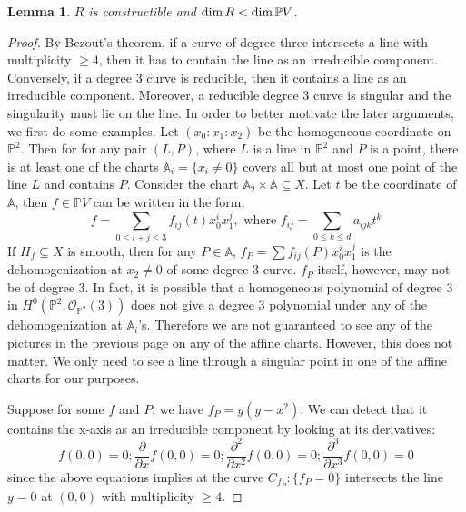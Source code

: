\documentclass[12pt]{article}
\theoremstyle{plain}
\newtheorem{lemma}[equation]{Lemma}
\theoremstyle{definition}
\newcommand{\IA}{\mathbb{A}}
\newcommand{\IP}{\mathbb{P}}
\newcommand{\sO}{\mathcal{O}}
\renewcommand\dim{{\rm dim\,}}
\newcommand{\<}{\langle}
\renewcommand{\>}{\rangle}
\newcommand{\p}{\partial}
\begin{document}
\begin{lemma}
$R$ is constructible and $\dim R < \dim \IP V$. 
\end{lemma}
\begin{proof}
By Bezout's theorem, if a curve of degree three intersects a line with multiplicity $\ge 4$, then it has to contain the line as an irreducible component. Conversely, if a degree 3 curve is reducible, then it contains a line as an irreducible component. Moreover, a reducible degree 3 curve is singular and the singularity must lie on the line. In order to better motivate the later arguments, we first do some examples. Let $(x_0 : x_1 : x_2)$ be the homogeneous coordinate on $\IP^2$. Then for for any pair $(L, P)$, where $L$ is a line in $\IP^2$ and $P$ is a point, there is at least one of the charts $\IA_i = \{ x_i  \neq 0 \}$ covers all but at most one point of the line $L$ and contains $P$. Consider the chart $\IA_2 \times \IA \subseteq X$. Let $t$ be the coordinate of $\IA$, then $f \in \IP V$ can be written in the form,
$$ f = \sum_{0 \le i + j \le 3} f_{ij}(t) x_0^i x_1^j, \text{ where } f_{ij} = \sum_{0 \le k \le d} a_{ijk} t^k $$
If $H_f \subseteq X$ is smooth, then for any $P \in \IA$, $f_P = \sum f_{ij}(P) x_0^i x_1^j$ is the dehomogenization at $x_2 \neq 0$ of some degree $3$ curve. $f_P$ itself, however, may not be of degree $3$. In fact, it is possible that a homogeneous polynomial of degree $3$ in $H^0(\IP^2, \sO_{\IP^2}(3))$ does not give a degree $3$ polynomial under any of the dehomogenization at $\IA_i$'s. Therefore we are not guaranteed to see any of the pictures in the previous page on any of the affine charts. However, this does not matter. We only need to see a line through a singular point in one of the affine charts for our purposes. 

Suppose for some $f$ and $P$, we have $f_P = y(y - x^2)$. We can detect that it contains the x-axis as an irreducible component by looking at its derivatives:
$$ f(0, 0) = 0; \frac{\p }{\p x} f(0, 0) = 0 ; \frac{\p^2 }{\p x^2} f(0, 0) = 0; \frac{\p^3 }{\p x^3} f(0, 0) = 0 $$
since the above equations implies at the curve $C_{f_P} : \{ f_P = 0 \}$ intersects the line $y = 0$ at $(0, 0)$ with multiplicity $\ge 4$. 


\end{proof}
\end{document}
